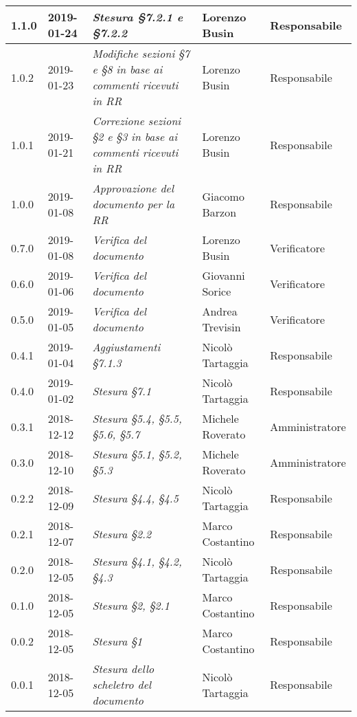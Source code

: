 \begin{longtable}{C{2cm}|C{2.5cm}|C{4.5cm}|C{2.5cm}|C{3cm}}
		1.1.0 & 2019-01-24 & \emph{Stesura §7.2.1 e §7.2.2} & Lorenzo Busin & Responsabile \\
		\hline

		1.0.2 & 2019-01-23 & \emph{Modifiche sezioni §7 e §8 in base ai commenti ricevuti in RR} & Lorenzo Busin & Responsabile \\
		\hline

		1.0.1 & 2019-01-21 & \emph{Correzione sezioni §2 e §3 in base ai commenti ricevuti in RR} & Lorenzo Busin & Responsabile \\
		\hline

		1.0.0 & 2019-01-08 & \emph{Approvazione del documento per la RR} & Giacomo Barzon & Responsabile \\
		\hline

		0.7.0 & 2019-01-08 & \emph{Verifica del documento} & Lorenzo Busin & Verificatore \\
		\hline

		0.6.0 & 2019-01-06 & \emph{Verifica del documento} & Giovanni Sorice & Verificatore \\
		\hline

		0.5.0 & 2019-01-05 & \emph{Verifica del documento} & Andrea Trevisin & Verificatore \\
		\hline

		0.4.1 & 2019-01-04 & \emph{Aggiustamenti §7.1.3} & Nicolò Tartaggia & Responsabile \\
		\hline

		0.4.0 & 2019-01-02 & \emph{Stesura §7.1} & Nicolò Tartaggia & Responsabile \\
		\hline

		0.3.1 & 2018-12-12 & \emph{Stesura §5.4, §5.5, §5.6, §5.7} & Michele Roverato & Amministratore \\
		\hline

		0.3.0 & 2018-12-10 & \emph{Stesura §5.1, §5.2, §5.3} & Michele Roverato & Amministratore \\
		\hline

		0.2.2 & 2018-12-09 & \emph{Stesura §4.4, §4.5} & Nicolò Tartaggia & Responsabile \\
		\hline

		0.2.1 & 2018-12-07 & \emph{Stesura §2.2} & Marco Costantino & Responsabile \\
		\hline

		0.2.0 & 2018-12-05 & \emph{Stesura §4.1, §4.2, §4.3} & Nicolò Tartaggia & Responsabile \\
		\hline

		0.1.0 & 2018-12-05 & \emph{\textit{Stesura §2, §2.1}} & Marco Costantino & Responsabile \\
		\hline

		0.0.2 & 2018-12-05 & \emph{Stesura §1} & Marco Costantino & Responsabile \\
		\hline

		0.0.1 & 2018-12-05 & \emph{Stesura dello scheletro del documento} & Nicolò Tartaggia & Responsabile \\

	\end{longtable}

\clearpage
